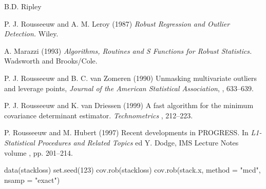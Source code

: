\begin{Author}\relax
B.D. Ripley\end{Author}
\begin{References}\relax
P. J. Rousseeuw and A. M. Leroy (1987) 
\emph{Robust Regression and Outlier Detection.}
Wiley.

A. Marazzi (1993) 
\emph{Algorithms, Routines and S Functions for Robust Statistics.}
Wadsworth and Brooks/Cole. 

P. J. Rousseeuw and B. C. van Zomeren (1990) Unmasking
multivariate outliers and leverage points, 
\emph{Journal of the American Statistical Association}, , 633--639.

P. J. Rousseeuw and K. van Driessen (1999) A fast algorithm for the
minimum covariance determinant estimator. \emph{Technometrics}
, 212--223.

P. Rousseeuw and M. Hubert (1997) Recent developments in PROGRESS. In
\emph{L1-Statistical Procedures and Related Topics }
ed Y. Dodge, IMS Lecture Notes volume , pp. 201--214.\end{References}
\begin{SeeAlso}\relax
{}\end{SeeAlso}
\begin{Examples}
\begin{ExampleCode}
data(stackloss)
set.seed(123)
cov.rob(stackloss)
cov.rob(stack.x, method = "mcd", nsamp = "exact")
\end{ExampleCode}
\end{Examples}

